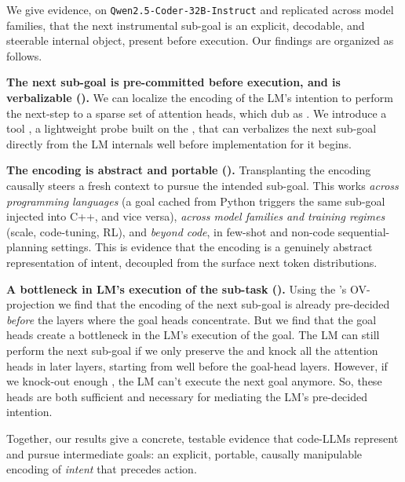 We give evidence, on \texttt{Qwen2.5-Coder-32B-Instruct} and replicated across model families, that the next instrumental sub-goal is an explicit, decodable, and steerable internal object, present before execution. Our findings are organized as follows.

\textbf{The next sub-goal is pre-committed before execution, and is verbalizable ().} We can localize the encoding of the LM's intention to perform the next-step to a sparse set of attention heads, which dub as \goalheads. We introduce a tool \goalscope, a lightweight probe built on the \goalheads, that can verbalizes the next sub-goal directly from the LM internals well before implementation for it begins.

\textbf{The encoding is abstract and portable ().} Transplanting the encoding causally steers a fresh context to pursue the intended sub-goal. This works \emph{across programming languages} (a goal cached from Python triggers the same sub-goal injected into C++, and vice versa), \emph{across model families and training regimes} (scale, code-tuning, RL), and \emph{beyond code}, in few-shot and non-code sequential-planning settings. This is evidence that the encoding is a genuinely abstract representation of intent, decoupled from the surface next token distributions.

\textbf{A bottleneck in LM's execution of the sub-task ().} Using the \goalheads's OV-projection we find that the encoding of the next sub-goal is already pre-decided \emph{before} the layers where the goal heads concentrate. But we find that the goal heads create a bottleneck in the LM's execution of the goal. The LM can still perform the next sub-goal if we only preserve the \goalheads and knock all the attention heads in later layers, starting from well before the goal-head layers. However, if we knock-out enough \goalheads, the LM can't execute the next goal anymore. So, these heads are both sufficient and necessary for mediating the LM's pre-decided intention. 

Together, our results give a concrete, testable evidence that code-LLMs represent and pursue intermediate goals: an explicit, portable, causally manipulable encoding of \emph{intent} that precedes action.  
